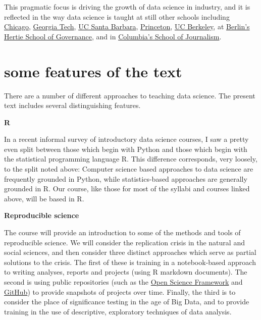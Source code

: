 \documentclass[
  openany]{book}
\begin{document}
This pragmatic focus is driving the growth of data science in industry, and it is reflected in the way data science is taught at still other schools including \href{https://github.com/UC-MACSS/persp-analysis}{Chicago}, \href{https://github.com/jacobeisenstein/gt-css-class}{Georgia Tech}, \href{https://github.com/raviolli77/dataScience-UCSBProjectGroup-Syllabus}{UC Santa Barbara}, \href{http://www.princeton.edu/~mjs3/soc596_f2016/}{Princeton}, \href{https://github.com/rochelleterman/PS239T}{UC Berkeley}, at \href{https://github.com/HertieDataScience/SyllabusAndLectures}{Berlin's Hertie School of Governance}, and in \href{https://github.com/tommeagher/data1-fall2015}{Columbia's School of Journalism}.

\hypertarget{some-features-of-the-text}{%
\section*{some features of the text}\label{some-features-of-the-text}}

There are a number of different approaches to teaching data science. The present text includes several distinguishing features.

\textbf{R}

In a recent informal survey of introductory data science courses, I saw a pretty even split between those which begin with Python and those which begin with the statistical programming language R. This difference corresponds, very loosely, to the split noted above: Computer science based approaches to data science are frequently grounded in Python, while statistics-based approaches are generally grounded in R. Our course, like those for most of the syllabi and courses linked above, will be based in R.

\textbf{Reproducible science}

The course will provide an introduction to some of the methods and tools of reproducible science. We will consider the replication crisis in the natural and social sciences, and then consider three distinct approaches which serve as partial solutions to the crisis. The first of these is training in a notebook-based approach to writing analyses, reports and projects (using R markdown documents). The second is using public repositories (such as the \href{https://osf.io/}{Open Science Framework} and \href{https://github.com/}{GitHub}) to provide snapshots of projects over time. Finally, the third is to consider the place of significance testing in the age of Big Data, and to provide training in the use of descriptive, exploratory techniques of data analysis.
\end{document}
